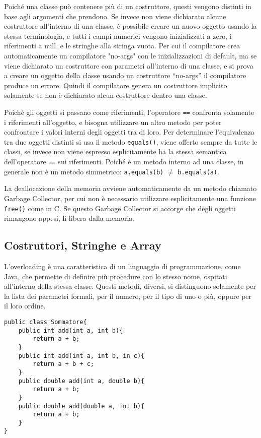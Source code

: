\documentclass{article}
\numberwithin{equation}{subsection}
\begin{document}
Poiché una classe può contenere più di un costruttore, questi vengono distinti in base agli argomenti che prendono. 
Se invece non viene dichiarato alcune costruttore all'interno di una classe, è possibile creare un nuovo oggetto usando la stessa terminologia, e tutti i campi numerici 
vengono inizializzati a zero, i riferimenti a null, e le stringhe alla stringa vuota. Per cui il compilatore crea automaticamente un compilatore "no-args" con le inizializzazioni 
di default, ma se viene dichiarato un costruttore con parametri all'interno di una classe, e si prova a creare un oggetto della classe usando un costruttore ``no-args'' il 
compilatore produce un errore. Quindi il compilatore genera un costruttore implicito solamente se non è dichiarato alcun costruttore dentro una classe. 


Poiché gli oggetti si passano come riferimenti, l'operatore \verb|==| confronta solamente i riferimenti all'oggetto, e bisogna utilizzare un altro metodo per poter 
confrontare i valori interni degli oggetti tra di loro.  
Per determinare l'equivalenza tra due oggetti distinti si usa il metodo \verb|equals()|, viene offerto sempre da tutte le classi, se invece non viene espresso esplicitamente 
ha la stessa semantica dell'operatore \verb|==| sui riferimenti. 
Poiché è un metodo interno ad una classe, in generale non è un metodo simmetrico: \verb|a.equals(b)| $\neq$ \verb|b.equals(a)|. 

La deallocazione della memoria avviene automaticamente da un metodo chiamato Garbage Collector, per cui non è necessario utilizzare esplicitamente una funzione \verb|free()| 
come in C. Se questo Garbage Collector si accorge che degli oggetti rimangono appesi, li libera dalla memoria. 

\subsection{Costruttori, Stringhe e Array}

L'overloading è una caratteristica di un linguaggio di programmazione, come Java, che permette di definire più procedure con lo stesso nome, ospitati all'interno della stessa 
classe. Questi metodi, diversi, si distinguono solamente per la lista dei parametri formali, per il numero, per il tipo di uno o più, oppure per il loro ordine. 

\begin{verbatim}
public class Sommatore{
    public int add(int a, int b){
        return a + b;
    }
    public int add(int a, int b, in c){
        return a + b + c;
    }        
    public double add(int a, double b){
        return a + b;
    }
    public double add(double a, int b){
        return a + b;
    }
}
\end{verbatim}
\end{document}
